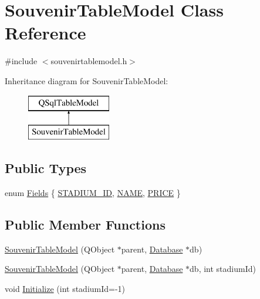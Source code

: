 \hypertarget{class_souvenir_table_model}{}\section{Souvenir\+Table\+Model Class Reference}
\label{class_souvenir_table_model}


{\ttfamily \#include $<$souvenirtablemodel.\+h$>$}

Inheritance diagram for Souvenir\+Table\+Model\+:\begin{figure}[H]
\begin{center}
\leavevmode
\includegraphics[height=2.000000cm]{class_souvenir_table_model}
\end{center}
\end{figure}
\subsection*{Public Types}
\begin{DoxyCompactItemize}
\item 
enum \hyperlink{class_souvenir_table_model_a678ba75189e65ec4902d8d33873c1467}{Fields} \{ \hyperlink{class_souvenir_table_model_a678ba75189e65ec4902d8d33873c1467a7e415b557e37cfaaebfe6f7f4dcad957}{S\+T\+A\+D\+I\+U\+M\+\_\+\+ID}, 
\hyperlink{class_souvenir_table_model_a678ba75189e65ec4902d8d33873c1467a1562f7948671504ce66f4abc2e781b91}{N\+A\+ME}, 
\hyperlink{class_souvenir_table_model_a678ba75189e65ec4902d8d33873c1467a2b832d332664f9bf0211f8254557e1b2}{P\+R\+I\+CE}
 \}
\end{DoxyCompactItemize}
\subsection*{Public Member Functions}
\begin{DoxyCompactItemize}
\item 
\hyperlink{class_souvenir_table_model_a61ddb206432239d2f3c0c0081e529903}{Souvenir\+Table\+Model} (Q\+Object $\ast$parent, \hyperlink{class_database}{Database} $\ast$db)
\item 
\hyperlink{class_souvenir_table_model_aa77b7b9de97a059a7a0b608ec18599fc}{Souvenir\+Table\+Model} (Q\+Object $\ast$parent, \hyperlink{class_database}{Database} $\ast$db, int stadium\+Id)
\item 
void \hyperlink{class_souvenir_table_model_a8a7188e334bdb2f11a20f598f305a5c9}{Initialize} (int stadium\+Id=-\/1)
\end{DoxyCompactItemize}


